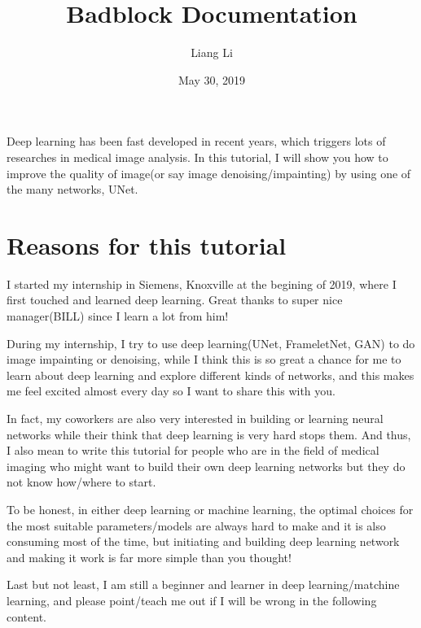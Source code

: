 \documentclass[letterpaper,10pt,english]{sphinxmanual}
\title{Badblock Documentation}
\date{May 30, 2019}
\author{Liang Li}
\begin{document}
\pagestyle{empty}
\maketitle
\pagestyle{plain}
\sphinxtableofcontents
\pagestyle{normal}
\label{\detokenize{index::doc}}


Deep learning has been fast developed in recent years, which triggers lots of researches in medical image analysis. In this tutorial, I will show you how to improve the quality of image(or say image denoising/impainting) by using one of the many networks, UNet.


\chapter{Reasons for this tutorial}
\label{\detokenize{index:reasons-for-this-tutorial}}
I started my internship in Siemens, Knoxville at the begining of 2019, where I first touched and learned deep learning.
Great thanks to super nice manager(BILL) since I learn a lot from him!

During my internship, I try to use deep learning(UNet, FrameletNet, GAN) to do image impainting or denoising, while I think this is so great a chance for me to learn about deep learning and explore different kinds of networks, and this makes me feel excited almost every day so I want to share this with you.

In fact, my coworkers are also very interested in building or learning neural networks while their think that deep learning is very hard stops them. And thus, I also mean to write this tutorial for people who are in the field of medical imaging who might want to build their own deep learning networks but they do not know how/where to start.

To be honest, in either deep learning or machine learning, the optimal choices for the most suitable parameters/models are always hard to make and it is also consuming most of the time, but initiating and building deep learning network and making it work is far more simple than you thought!

Last but not least, I am still a beginner and learner in deep learning/matchine learning, and please point/teach me out if I will be wrong in the following content.
\end{document}
